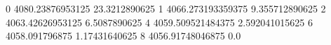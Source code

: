 0 4080.23876953125 23.3212890625
1 4066.273193359375 9.355712890625
2 4063.42626953125 6.5087890625
4 4059.509521484375 2.592041015625
6 4058.091796875 1.17431640625
8 4056.91748046875 0.0
